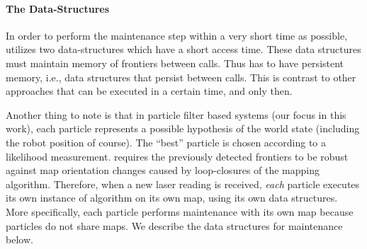 		 		
	
	
	

	\paragraph{The \FFD Data-Structures}
	In order to perform the maintenance step within a very short time as possible,
	\FFD utilizes two data-structures which have a short access time.  These data structures
        must maintain memory of frontiers between calls. Thus \FFD has to have persistent memory,
        i.e., data structures that persist between calls. This is contrast to
        other approaches that can be executed in a certain time, and only then. 

	Another thing to note is that in particle filter based systems (our focus in
	this work), each particle represents a possible hypothesis of the world state
	(including the robot position of course). The ``best'' particle is chosen
	according to a likelihood measurement. \FFD requires the previously detected
	frontiers to be robust against map orientation changes caused by loop-closures
	of the mapping algorithm.
	Therefore, when a new laser reading is received, \emph{each} particle executes
	its own instance of \FFD algorithm on its own map, using its own data structures. More
	specifically, each particle performs maintenance with its own map because
	particles do not share maps.
	We describe the data structures for maintenance below.
	
